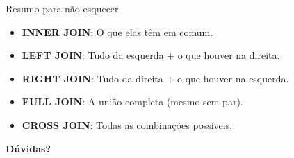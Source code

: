 \documentclass[10pt]{beamer}
\begin{document}
\begin{frame}{Resumo para não esquecer}
    \begin{itemize}
        \item \textbf{INNER JOIN}: O que elas têm em comum.
        \item \textbf{LEFT JOIN}: Tudo da esquerda + o que houver na direita.
        \item \textbf{RIGHT JOIN}: Tudo da direita + o que houver na esquerda.
        \item \textbf{FULL JOIN}: A união completa (mesmo sem par).
        \item \textbf{CROSS JOIN}: Todas as combinações possíveis.
    \end{itemize}
    \vspace{1em}
    \centering
    \textbf{Dúvidas?}
\end{frame}
\end{document}

